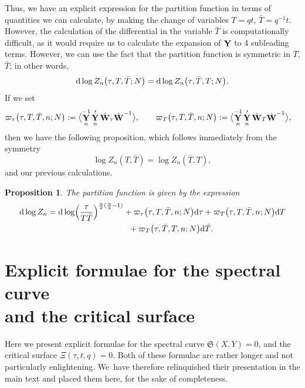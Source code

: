 \documentclass[pdftex]{sigma}
\DeclareMathOperator{\YY}{{\bf Y}}
\DeclareMathOperator{\WW}{{\bf W}}
\numberwithin{equation}{section}
\newtheorem{Proposition}[Theorem]{Proposition}
 { \theoremstyle{definition}
\newtheorem{Definition}[Theorem]{Definition}
\newtheorem{Note}[Theorem]{Note}
\newtheorem{Example}[Theorem]{Example}
\newtheorem{Remark}[Theorem]{Remark} }
\begin{document}
Thus, we have an explicit expression for the partition function in terms of quantities we can calculate, by making the change of variables $T = q t$, $\bar{T} = q^{-1} t$. However, the calculation of the differential in the variable $\bar{T}$ is computationally difficult, as it would require us to calculate the expansion of $\YY$ to 4 subleading terms. However, we can use the fact that the partition function is symmetric in $T$, $\bar{T}$; in other words,
 \begin{equation*}
 {\rm d} \log Z_n\bigl(\tau,T,\bar{T};N\bigr) = {\rm d} \log Z_n\bigl(\tau,\bar{T},T;N\bigr).
 \end{equation*}
If we set
 \begin{align*}
 &\varpi_{\tau}\bigl(\tau,T,\bar{T},n;N\bigr) := \bigl\langle \YY_n^{-1}\YY_n' \hat{\WW}_\tau \hat{\WW}^{-1}\bigr\rangle,\qquad
 \varpi_{T}\bigl(\tau,T,\bar{T},n;N\bigr) := \bigl\langle \YY_n^{-1}\YY_n' \hat{\WW}_T \hat{\WW}^{-1}\bigr\rangle,
 \end{align*}
then we have the following proposition, which follows immediately from the symmetry
\[
\log Z_n(T,\bar{T}) = \log Z_n(\bar{T},T),
\] and our previous calculations.

\begin{Proposition}
 The partition function is given by the expression
 \begin{gather*}
 {\rm d} \log Z_n = {\rm d}\log\Bigl(\frac{\tau}{T\bar{T}}\Bigr)^{\frac{n}{2}(\frac{n}{3}-1)} + \varpi_{\tau}\bigl(\tau,T,\bar{T},n;N\bigr) {\rm d}\tau +
 \varpi_{T}\bigl(\tau,T,\bar{T},n;N\bigr) {\rm d}T\\
 \hphantom{{\rm d} \log Z_n =}{}
 + \varpi_{T}\bigl(\tau,\bar{T},T,n;N\bigr) {\rm d}\bar{T}.
 \end{gather*}
\end{Proposition}

\section[Explicit formulae for the spectral curve and the critical surface]{Explicit formulae for the spectral curve \\ and the critical surface}\label{Critical-Surface-Appendix}
Here we present explicit formulae for the spectral curve $\mathfrak{S}(X,Y) = 0$, and the critical surface $\Xi(\tau,t,q) = 0$. Both of these formulae are rather longer and not particularly enlightening. We~have therefore relinquished their presentation in the main text and placed them here, for the sake of completeness.
\end{document}
